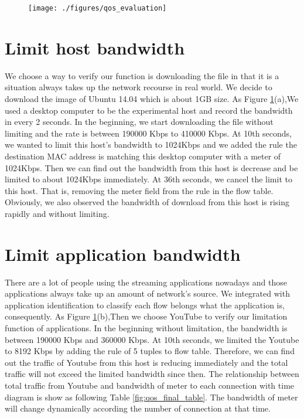 \documentclass[journal]{IEEEtran}
\begin{document}
\begin{figure}[!t]
\centering
\texttt{[image: ./figures/qos\_evaluation]}
\label{fig:qos_evaluation}
\end{figure}

\section{Limit host bandwidth}
We choose a way to verify our function is downloading the file in that it is a situation always takes up the network recourse in real world. We decide to download the image of Ubuntu 14.04 which is about 1GB size.
As Figure \ref{fig:qos_evaluation}(a),We used a desktop computer to be the experimental host and record the bandwidth in every 2 seconds. In the beginning, we start downloading the file without limiting and the rate is between 190000 Kbps to 410000 Kbps. At 10th seconds, we wanted to limit this host’s bandwidth to 1024Kbps and we added the rule the destination MAC address is matching this desktop computer with a meter of 1024Kbps. Then we can find out the bandwidth from this host is decrease and be limited to about 1024Kbps immediately.
At 36th seconds, we cancel the limit to this host. That is, removing the meter field from the rule in the flow table. Obviously, we also observed the bandwidth of download from this host is rising rapidly and without limiting.


\section{Limit application bandwidth}
There are a lot of people using the streaming applications nowadays and those applications always take up an amount of network’s source. We integrated with application identification to classify each flow belongs what the application is, consequently.
As Figure \ref{fig:qos_evaluation}(b),Then we choose YouTube to verify our limitation function of applications. In the beginning without limitation, the bandwidth is between 190000 Kbps and 360000 Kbps. At 10th seconds, we limited the Youtube to 8192 Kbps by adding the rule of 5 tuples to flow table. Therefore, we can find out the traffic of Youtube from this host is reducing immediately and the total traffic will not exceed the limited bandwidth since then.
The relationship between total traffic from Youtube and bandwidth of meter to each connection with time diagram is show as following Table \ref{fig:qos_final_table}. The bandwidth of meter will change dynamically according the number of connection at that time.
\end{document}
